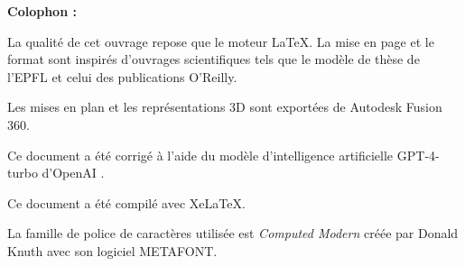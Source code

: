 \clearpage
\Large\textbf{Colophon :}\par\normalsize
\thispagestyle{empty}
La qualité de cet ouvrage repose que le moteur \LaTeX. La mise en page et le format sont inspirés d'ouvrages scientifiques tels que le modèle de thèse de l'EPFL et celui des publications O'Reilly.

Les mises en plan et les représentations 3D sont exportées de Autodesk Fusion 360.


Ce document a été corrigé à l'aide du modèle d'intelligence artificielle  GPT-4-turbo d'OpenAI \cite{chatgptCorrectionRapport}.

Ce document a été compilé avec XeLaTeX.

La famille de police de caractères utilisée est \emph{Computed Modern} créée par Donald Knuth avec son logiciel METAFONT.
\vfil
